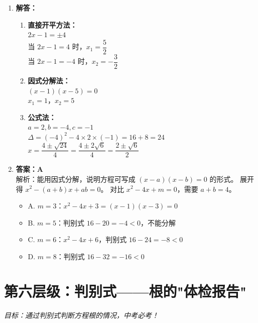 \documentclass[12pt, a4paper]{article}
\begin{document}
\begin{answerbox}
    \begin{enumerate}
        \item \textbf{解答：}
        \begin{enumerate}
            \item[(1)] \textbf{直接开平方法：} \\
            $2x - 1 = \pm 4$ \\
            当 $2x - 1 = 4$ 时，$x_1 = \dfrac{5}{2}$ \\
            当 $2x - 1 = -4$ 时，$x_2 = -\dfrac{3}{2}$
            
            \item[(2)] \textbf{因式分解法：} \\
            $(x-1)(x-5) = 0$ \\
            $x_1 = 1$，$x_2 = 5$
            
            \item[(3)] \textbf{公式法：} \\
            $a=2, b=-4, c=-1$ \\
            $\Delta = (-4)^2 - 4 \times 2 \times (-1) = 16 + 8 = 24$ \\
            $x = \dfrac{4 \pm \sqrt{24}}{4} = \dfrac{4 \pm 2\sqrt{6}}{4} = \dfrac{2 \pm \sqrt{6}}{2}$
        \end{enumerate}
        
        \item \textbf{答案：A} \\
        解析：能用因式分解，说明方程可写成 $(x-a)(x-b)=0$ 的形式。
        展开得 $x^2 - (a+b)x + ab = 0$。
        对比 $x^2 - 4x + m = 0$，需要 $a + b = 4$。
        \begin{itemize}
            \item A. $m=3$：$x^2 - 4x + 3 = (x-1)(x-3) = 0$ \checkmark
            \item B. $m=5$：判别式 $16-20=-4<0$，不能分解
            \item C. $m=6$：$x^2 - 4x + 6$，判别式 $16-24=-8<0$
            \item D. $m=8$：判别式 $16-32=-16<0$
        \end{itemize}
    \end{enumerate}
\end{answerbox}

\section{第六层级：判别式——根的"体检报告"}
\textit{目标：通过判别式判断方程根的情况，中考必考！}
\end{document}
